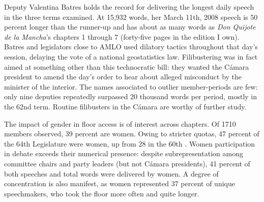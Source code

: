 \documentclass[letter,12pt]{article}
\begin{document}
Deputy Valentina Batres holds the record for delivering the longest daily speech in the three terms examined. At 15,932 words, her March 11th, 2008 speech is 50 percent longer than the runner-up and has about as many words as \emph{Don Quijote de la Mancha}'s chapters 1 through 7 (forty-five pages in the edition I own). Batres and legislators close to AMLO used dilatory tactics throughout that day's session, delaying the vote of a national geostatistics law. Filibustering was in fact aimed at something other than this technocratic bill: they wanted the Cámara president to amend the day's order to hear about alleged misconduct by the minister of the interior. The names associated to outlier member-periods are few: only nine deputies repeatedly surpassed 20 thousand words per period, mostly in the 62nd term. Routine filibusters in the Cámara are worthy of further study. 




The impact of gender in floor access is of interest across chapters. Of 1710 members observed, 39 percent are women. Owing to stricter quotas, 47 percent of the 64th Legislature were women, up from 28 in the 60th \citep{piscopo.2016}. Women participation in debate exceeds their numerical presence: despite subrepresentation among committee chairs and party leaders (but not Cámara presidents), 41 percent of both speeches and total words were delivered by women. A degree of concentration is also manifest, as women represented 37 percent of unique speechmakers, who took the floor more often and quite longer. 
\end{document}
